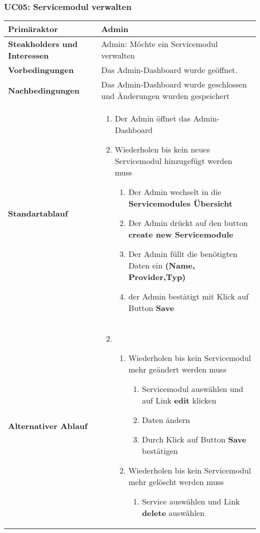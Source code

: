 \subsubsection{UC05: Servicemodul verwalten}
\begin{longtabu} to \textwidth {X[1,l] X[2,l]}
	\bfseries Primäraktor & Admin  \\\hline 
	\bfseries Steakholders und Interessen & Admin: Möchte ein Servicemodul verwalten  \\\hline 
	\bfseries Vorbedingungen & Das Admin-Dashboard wurde geöffnet.
	 \\\hline 
	\bfseries Nachbedingungen & Das Admin-Dashboard wurde geschlossen und 
	Änderungen wurden gespeichert \\\hline 
	\bfseries Standartablauf & 
	\begin{enumerate}
			\item Der Admin öffnet das Admin-Dashboard
			\item Wiederholen bis kein neues Servicemodul hinzugefügt werden muss
			\begin{enumerate}
			  \item Der Admin wechselt in die \textbf{Servicemodules Übersicht}
			  \item Der Admin drückt auf den button \textbf{create new Servicemodule}
			  \item Der Admin füllt die benötigten Daten ein \textbf{(Name, Provider,Typ)}
			  \item der Admin bestätigt mit Klick auf Button \textbf{Save}
			\end{enumerate}
		\end{enumerate}
      \\\hline
      \bfseries Alternativer Ablauf & 
      \begin{enumerate}
        \setcounter{enumi}{1}
        \item 
        \begin{enumerate}
          \item Wiederholen bis kein Servicemodul mehr geändert werden muss
            \begin{enumerate}
              \item Servicemodul auswählen und auf Link \textbf{edit} klicken
              \item Daten ändern
              \item Durch Klick auf Button \textbf{Save} bestätigen
            \end{enumerate}
            \item Wiederholen bis kein Servicemodul mehr gelöscht werden muss
            \begin{enumerate}
              \item Service auswählen und Link \textbf{delete} auswählen
            \end{enumerate}
        \end{enumerate}
      \end{enumerate}
      \\\hline


\end{longtabu}

